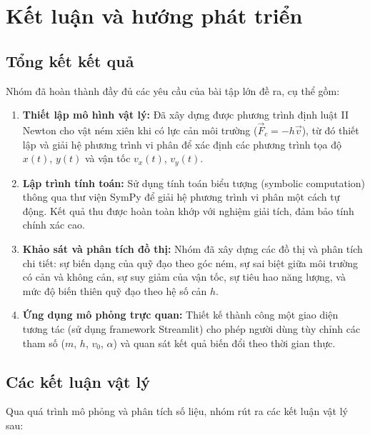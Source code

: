 \section{Kết luận và hướng phát triển}

\subsection{Tổng kết kết quả}
Nhóm đã hoàn thành đầy đủ các yêu cầu của bài tập lớn đề ra, cụ thể gồm:

\begin{enumerate}
    \item \textbf{Thiết lập mô hình vật lý:} Đã xây dựng được phương trình định luật II Newton cho vật ném xiên khi có lực cản môi trường ($\vec{F}_c = -h\vec{v}$), từ đó thiết lập và giải hệ phương trình vi phân để xác định các phương trình tọa độ $x(t)$, $y(t)$ và vận tốc $v_x(t)$, $v_y(t)$.
    
    \item \textbf{Lập trình tính toán:} Sử dụng tính toán biểu tượng (symbolic computation) thông qua thư viện SymPy để giải hệ phương trình vi phân một cách tự động. Kết quả thu được hoàn toàn khớp với nghiệm giải tích, đảm bảo tính chính xác cao.
    
    \item \textbf{Khảo sát và phân tích đồ thị:} Nhóm đã xây dựng các đồ thị và phân tích chi tiết: sự biến dạng của quỹ đạo theo góc ném, sự sai biệt giữa môi trường có cản và không cản, sự suy giảm của vận tốc, sự tiêu hao năng lượng, và mức độ biến thiên quỹ đạo theo hệ số cản $h$.
    
    \item \textbf{Ứng dụng mô phỏng trực quan:} Thiết kế thành công một giao diện tương tác (sử dụng framework Streamlit) cho phép người dùng tùy chỉnh các tham số ($m$, $h$, $v_0$, $\alpha$) và quan sát kết quả biến đổi theo thời gian thực.
\end{enumerate}

\subsection{Các kết luận vật lý}
Qua quá trình mô phỏng và phân tích số liệu, nhóm rút ra các kết luận vật lý sau:

